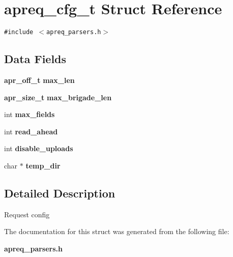 \section{apreq\_\-cfg\_\-t Struct Reference}
\label{structapreq__cfg__t}
{\tt \#include $<$apreq\_\-parsers.h$>$}

\subsection*{Data Fields}
\begin{CompactItemize}
\item 
{\bf apr\_\-off\_\-t} {\bf max\_\-len}\label{structapreq__cfg__t_m0}

\item 
{\bf apr\_\-size\_\-t} {\bf max\_\-brigade\_\-len}\label{structapreq__cfg__t_m1}

\item 
int {\bf max\_\-fields}\label{structapreq__cfg__t_m2}

\item 
int {\bf read\_\-ahead}\label{structapreq__cfg__t_m3}

\item 
int {\bf disable\_\-uploads}\label{structapreq__cfg__t_m4}

\item 
char $\ast$ {\bf temp\_\-dir}\label{structapreq__cfg__t_m5}

\end{CompactItemize}


\subsection{Detailed Description}
Request config 



The documentation for this struct was generated from the following file:\begin{CompactItemize}
\item 
{\bf apreq\_\-parsers.h}\end{CompactItemize}
